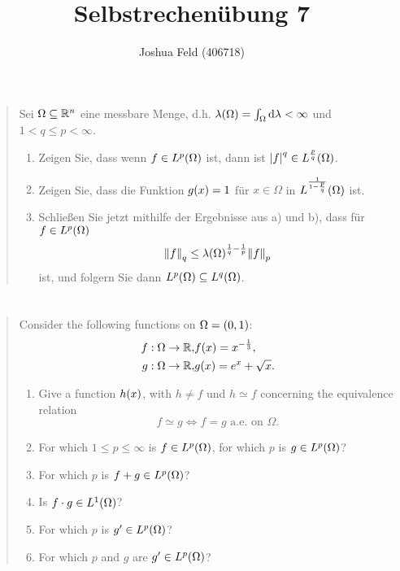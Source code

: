 \documentclass{exercise}
\title{Selbstrechenübung 7}
\author{Joshua Feld (406718)}
\begin{document}
	\maketitle


	\section{}

	\begin{quote}
		Sei \(\Omega \subseteq \R^n\) eine messbare Menge, d.h. \(\lambda\parentheses*{\Omega} = \int_\Omega \d\lambda < \infty\) und \(1 < q \le p < \infty\).
		\begin{enumerate}
			\item Zeigen Sie, dass wenn \(f \in L^p\parentheses*{\Omega}\) ist, dann ist \(\absolute*{f}^q \in L^{\frac{p}{q}}\parentheses*{\Omega}\).
			\item Zeigen Sie, dass die Funktion \(g\parentheses*{x} = 1\) für \(x \in \Omega\) in \(L^{\frac{1}{1 - \frac{p}{q}}}\parentheses*{\Omega}\) ist.
			\item Schließen Sie jetzt mithilfe der Ergebnisse aus a) und b), dass für \(f \in L^p\parentheses*{\Omega}\)
			\[
				\norm*{f}_q \le \lambda\parentheses*{\Omega}^{\frac{1}{q} - \frac{1}{p}}\norm*{f}_p
			\]
			ist, und folgern Sie dann \(L^p\parentheses*{\Omega} \subseteq L^q\parentheses*{\Omega}\).
		\end{enumerate}
	\end{quote}


	\section{}

	\begin{quote}
		Consider the following functions on \(\Omega = \parentheses*{0, 1}\):
		\begin{align*}
			f: \Omega \to \R, &f\parentheses*{x} = x^{-\frac{1}{3}},\\
			g: \Omega \to \R, &g\parentheses*{x} = e^x + \sqrt{x}.
		\end{align*}
		\begin{enumerate}
			\item Give a function \(h\parentheses*{x}\), with \(h \ne f\) und \(h \simeq f\) concerning the equivalence relation
			\[
				f \simeq g \iff f = g\text{ a.e. on }\Omega.
			\]
			\item For which \(1 \le p \le \infty\) is \(f \in L^p\parentheses*{\Omega}\), for which \(p\) is \(g \in L^p\parentheses*{\Omega}\)?
			\item For which \(p\) is \(f + g \in L^p\parentheses*{\Omega}\)?
			\item Is \(f \cdot g \in L^1\parentheses*{\Omega}\)?
			\item For which \(p\) is \(g' \in L^p\parentheses*{\Omega}\)?
			\item For which \(p\) and \(g\) are \(g' \in L^p\parentheses*{\Omega}\)?
		\end{enumerate}
	\end{quote}
\end{document}
